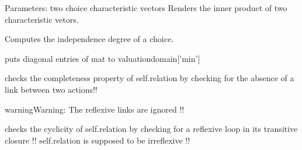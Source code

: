 \documentclass[letterpaper,10pt,english]{sphinxmanual}
\begin{document}
\begin{fulllineitems}
\begin{fulllineitems}
\end{fulllineitems}


\begin{fulllineitems}
\label{techDoc:digraphs.Digraph.inner_prod}
Parameters: two choice characteristic vectors
Renders the inner product of two characteristic vetors.

\end{fulllineitems}


\begin{fulllineitems}
\label{techDoc:digraphs.Digraph.intstab}
Computes the independence degree of a choice.

\end{fulllineitems}


\begin{fulllineitems}
\label{techDoc:digraphs.Digraph.irreflex}
puts diagonal entries of mat to valuationdomain{[}'min'{]}

\end{fulllineitems}


\begin{fulllineitems}
\label{techDoc:digraphs.Digraph.isComplete}
checks the completeness property of self.relation by checking
for the absence of a link between two actions!!

\begin{notice}{warning}{Warning:}
The reflexive links are ignored !!
\end{notice}

\end{fulllineitems}


\begin{fulllineitems}
\label{techDoc:digraphs.Digraph.isCyclic}
checks the cyclicity of self.relation by checking
for a reflexive loop in its transitive closure
!! self.relation is supposed to be irreflexive !!


\end{fulllineitems}
\end{fulllineitems}
\end{document}
